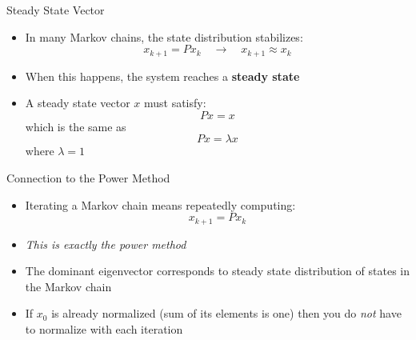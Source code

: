 \documentclass[10pt]{beamer}
\begin{document}
\begin{frame}{Steady State Vector}

\begin{itemize}
    \item In many Markov chains, the state distribution stabilizes:
    \[
    x_{k+1} = Px_k \quad \longrightarrow \quad x_{k+1} \approx x_k
    \]
    \item When this happens, the system reaches a \textbf{steady state}

    \item A steady state vector $x$  must satisfy:
    \[
    Px = x
    \]
    which is the same as 
    $$
    Px = \lambda x
    $$
    where $\lambda=1$

\end{itemize}
\end{frame}


\begin{frame}{Connection to the Power Method}

\begin{itemize}
    \item Iterating a Markov chain means repeatedly computing:
    \[
    x_{k+1} = Px_k
    \]
    \item \emph{This is exactly the power method}
    \item The dominant eigenvector corresponds to steady state distribution of states in the Markov chain

    \item If $x_0$ is already normalized (sum of its elements is one) then you do \emph{not} have to normalize with each iteration
\end{itemize}

\end{frame}
\end{document}
